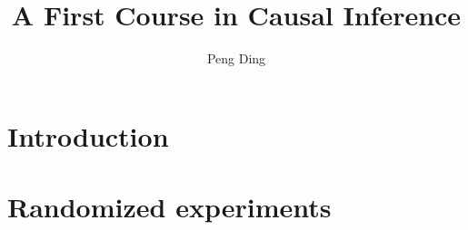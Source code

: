 \documentclass[krantz1]{krantz}
\begin{document}
\frontmatter

\title{A First Course in Causal Inference}
\author{Peng Ding}

\maketitle


\tableofcontents
%





\mainmatter





\makeatletter
{}
\makeatother

\renewcommand {\theexample} {\thechapter.\arabic{example}}
\renewcommand {\theassumption} {\thechapter.\arabic{assumption}}
\renewcommand {\thelemma} {\thechapter.\arabic{lemma}}
\renewcommand {\thetheorem} {\thechapter.\arabic{theorem}}
\renewcommand {\theremark} {\thechapter.\arabic{remark}}
\renewcommand {\thecondition} {\thechapter.\arabic{condition}}
\renewcommand {\thecorollary} {\thechapter.\arabic{corollary}}
\renewcommand {\theproposition} {\thechapter.\arabic{proposition}}
\renewcommand {\thedefinition} {\thechapter.\arabic{definition}}

 
 
 
\part{Introduction}\label{part::introduction}
 
  
 
\part{Randomized experiments}\label{part::rcts}
  
  

   
   
    
      
   
\end{document}
